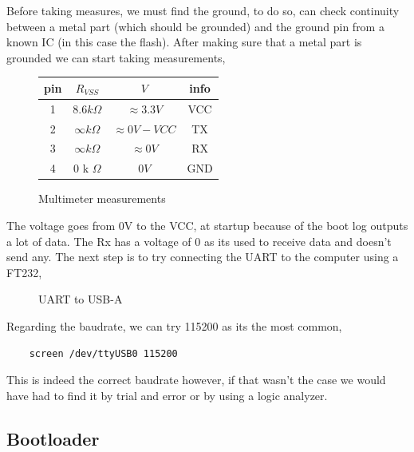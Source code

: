 \documentclass{article}
\begin{document}
\noindent Before taking measures, we must find the ground, to do so, can check continuity between a metal part (which should be grounded) and the ground pin from a known IC (in this case the flash). After making sure that a metal part is grounded we can start taking measurements,
\begin{figure}[!ht]
	\centering
	\begin{tabular}{|c|c|c|c|}
		\hline
		pin & $R_{VSS}$ & $V$ & info \\ 
		\hline
		1 & $8.6k\Omega$ & $\approx 3.3V$ & VCC \\
		2 & $\infty k\Omega$ & $\approx 0V - VCC$ & TX\\
		3 & $\infty k\Omega$ & $\approx 0V$ & RX \\
		4 & $0$ k $\Omega$ & $0V$ & GND \\
		\hline
	\end{tabular}
	\caption{Multimeter measurements}
\end{figure}

\noindent The voltage goes from 0V to the VCC, at startup because of the boot log outputs a lot of data. The Rx has a voltage of 0 as its used to receive data and doesn't send any. The next step is to try connecting the UART to the computer using a FT232, 
\begin{figure}[!ht]
	\centering
	
	\caption{UART to USB-A }
\end{figure}

\noident Regarding the baudrate, we can try 115200 as its the most common,
\begin{lstlisting}
	screen /dev/ttyUSB0 115200
\end{lstlisting} 
This is indeed the correct baudrate however, if that wasn't the case we would have had to find it by trial and error or by using a logic analyzer.
\subsection{Bootloader}
\end{document}
